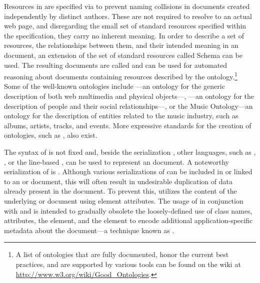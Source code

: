 \documentclass[a5paper,10pt]{book}
\begin{document}
Resources in  are specified via  to prevent naming
collisions in  documents created independently by distinct authors.
These  are not required to resolve to an actual web page, and
disregarding the small set of standard resources specified within the
 specification, they carry no inherent meaning. In order to
describe a set of resources, the relationships between them, and their intended
meaning in an  document, an extension of the set of standard
resources called  Schema \cite{brickley04} can be used. The
resulting documents are called 
 and can be used for automated reasoning about
 documents containing resources described by the
ontology.\footnote{
  A list of ontologies that are fully documented, honor the current best
  practices, and are supported by various tools can be found on the
   wiki at \url{http://www.w3.org/wiki/Good_Ontologies}.
} Some of the well-known ontologies include ---an ontology for the
generic description of both web multimedia and physical objects---,
---an ontology for the description of people and their social
relationships---, or the Music Ontology---an ontology for the description of
entities related to the music industry, such as albums, artists, tracks, and
events. More expressive standards for the creation of ontologies, such as
, also exist.

The syntax of  is not fixed and, beside the 
serialization \cite{lassira99}, other languages, such as ,
 \cite{beckett14:turtle}, or the line-based 
\cite{beckett14:nt}, can be used to represent an  document. A
noteworthy serialization of  is .  Although various
serializations of  can be included in or linked to an
 or  document, this will often result in
undesirable duplication of data already present in the document. To prevent
this,  utilizes the content of the underlying  or
 document using element attributes. The usage of 
in conjunction with  and  is intended to gradually
obsolete the loosely-defined use of  class names, attributes, the
 element, and the  element to encode additional
application-specific metadata about the document---a technique known as
.
\end{document}
